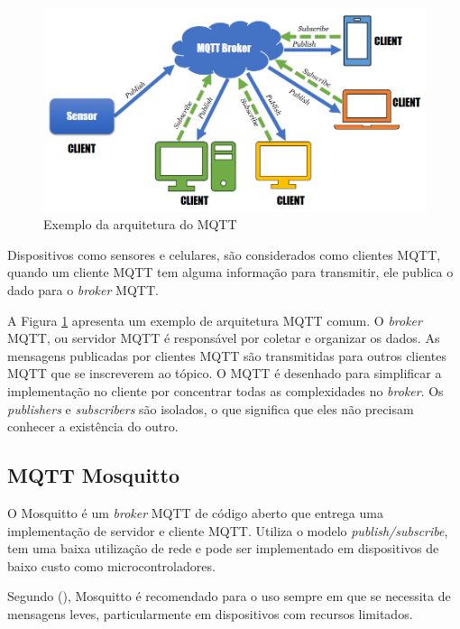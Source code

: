\begin{figure}[htbp]
	\centering
	\includegraphics[width=1\linewidth]{figuras/mqtt-architecture.png}
	\caption{Exemplo da arquitetura do MQTT}
	\label{fig:arquitetura-mqtt}
\end{figure}

Dispositivos como sensores e celulares, são considerados como clientes MQTT, quando um cliente MQTT tem alguma informação para transmitir, ele publica o dado para o \textit {broker} MQTT.

A Figura \ref{fig:arquitetura-mqtt} apresenta um exemplo de arquitetura MQTT comum. O \textit {broker} MQTT, ou servidor MQTT é responsável por coletar e organizar os dados. As mensagens publicadas por clientes MQTT são transmitidas para outros clientes MQTT que se inscreverem ao tópico. O MQTT é desenhado para simplificar a implementação no cliente por concentrar todas as complexidades no \textit {broker}. Os \textit {publishers} e \textit {subscribers} são isolados, o que significa que eles não precisam conhecer a existência do outro.

\subsection{MQTT Mosquitto}

O Mosquitto é um \textit{broker} MQTT de código aberto \cite{Kodali2017} que entrega uma implementação de servidor e cliente MQTT. Utiliza o modelo \textit{publish/subscribe}, tem uma baixa utilização de rede e pode ser implementado em dispositivos de baixo custo como microcontroladores. \cite{Light}

Segundo \citeauthor{Light} (\citeyear{Light}), Mosquitto é recomendado para o uso sempre em que se necessita de mensagens leves, particularmente em dispositivos com recursos limitados.

